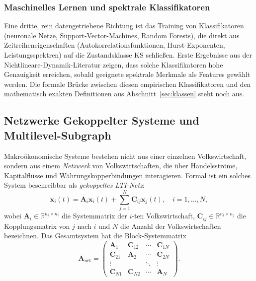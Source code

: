 \documentclass[a4paper, 12pt, twoside, openright]{report}
\theoremstyle{definition}
\theoremstyle{definition}
\newcommand{\R}{\mathbb{R}}
\newcommand{\vx}{\bm{x}}
\newcommand{\vA}{\bm{A}}
\newcommand{\vC}{\bm{C}}
\newcommand{\KS}{\mathrm{KS}}
\begin{document}
\subsubsection*{Maschinelles Lernen und spektrale Klassifikatoren}

Eine dritte, rein datengetriebene Richtung ist das Training von Klassifikatoren
(neuronale Netze, Support-Vector-Machines, Random Forests), die direkt aus
Zeitreiheneigenschaften (Autokorrelationsfunktionen, Hurst-Exponenten,
Leistungsspektren) auf die Zustandsklasse $\KS$ schließen. Erste Ergebnisse aus
der Nichtlineare-Dynamik-Literatur zeigen, dass solche Klassifikatoren hohe
Genauigkeit erreichen, sobald geeignete spektrale Merkmale als Features gewählt werden.
Die formale Brücke zwischen diesen empirischen Klassifikatoren und den mathematisch
exakten Definitionen aus Abschnitt~\ref{sec:klassen} steht noch aus.

\subsection{Netzwerke Gekoppelter Systeme und Multilevel-Subgraph}
\label{subsec:netzwerke}

Makroökonomische Systeme bestehen nicht aus einer einzelnen Volkswirtschaft, sondern
	aus einem \emph{Netzwerk} von Volkswirtschaften, die über Handelsströme, Kapitalflüsse
und Währungskopper\-bindungen interagieren. Formal ist ein solches System beschreibbar
als \emph{gekoppeltes LTI-Netz}:
\begin{equation}
  \dot{\vx}_i(t) = \vA_i\vx_i(t) + \sum_{j=1}^{N} \vC_{ij}\vx_j(t), \quad i = 1, \ldots, N,
  \label{eq:netz}
\end{equation}
wobei $\vA_i \in \R^{n_i \times n_i}$ die Systemmatrix der $i$-ten Volkswirtschaft,
$\vC_{ij} \in \R^{n_i \times n_j}$ die Kopplungsmatrix von $j$ nach $i$
und $N$ die Anzahl der Volkswirtschaften bezeichnen. Das Gesamtsystem hat die
Block-Systemmatrix
\begin{equation}
  \vA_{\mathrm{net}} = \begin{pmatrix}
    \vA_1 & \vC_{12} & \cdots & \vC_{1N} \\
    \vC_{21} & \vA_2 & \cdots & \vC_{2N} \\
    \vdots & & \ddots & \vdots \\
    \vC_{N1} & \vC_{N2} & \cdots & \vA_N
  \end{pmatrix}.
  \label{eq:blockmat}
\end{equation}
\end{document}
